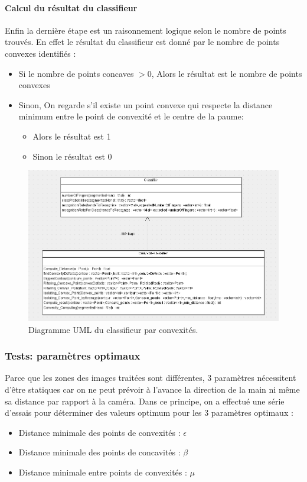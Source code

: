 \paragraph{Calcul du résultat du classifieur}
Enfin la dernière étape est un raisonnement logique selon le nombre de points trouvés. En effet le résultat du classifieur est donné par le nombre de points convexes identifiés :

\begin{itemize}
\item Si le nombre de points concaves $> 0$, Alors le résultat est le nombre de points convexes
\item Sinon, On regarde s’il existe un point convexe qui respecte la distance minimum entre le point de convexité et le centre de la paume:
\begin{itemize}
\item Alors le résultat est 1
\item Sinon le résultat est 0
\end{itemize}
\end{itemize}

\begin{figure}
\centerline{\includegraphics[scale=0.6]{umlConvexity.png}}
\caption{Diagramme UML du classifieur par convexités.}
\end{figure}

\subsubsection{Tests: paramètres optimaux}

Parce que les zones des images traitées sont différentes, 3 paramètres nécessitent d’être statiques car on ne peut prévoir à l’avance la direction de la main ni même sa distance par rapport à la caméra.
Dans ce principe, on a effectué une série d’essais pour déterminer des valeurs optimum pour les 3 paramètres optimaux :
\begin{itemize}
\item Distance minimale des points de convexités : $\epsilon$
\item Distance minimale des points de concavités : $\beta$
\item Distance minimale entre points de convexités : $\mu$
\end{itemize}

